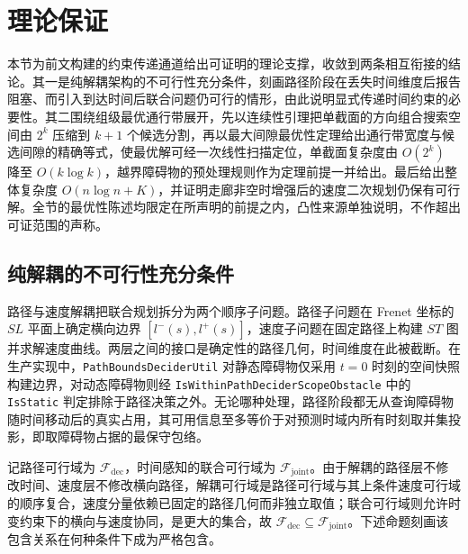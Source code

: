 \documentclass[a4paper,11pt]{ctexart}
\theoremstyle{definition}
\begin{document}
\section{理论保证}
\label{sec:theory}

本节为前文构建的约束传递通道给出可证明的理论支撑，收敛到两条相互衔接的结论。其一是纯解耦架构的不可行性充分条件，刻画路径阶段在丢失时间维度后报告阻塞、而引入到达时间后联合问题仍可行的情形，由此说明显式传递时间约束的必要性。其二围绕组级最优通行带展开，先以连续性引理把单截面的方向组合搜索空间由 $2^k$ 压缩到 $k+1$ 个候选分割，再以最大间隙最优性定理给出通行带宽度与候选间隙的精确等式，使最优解可经一次线性扫描定位，单截面复杂度由 $O(2^k)$ 降至 $O(k\log k)$，越界障碍物的预处理规则作为定理前提一并给出。最后给出整体复杂度 $O(n\log n + K)$，并证明走廊非空时增强后的速度二次规划仍保有可行解。全节的最优性陈述均限定在所声明的前提之内，凸性来源单独说明，不作超出可证范围的声称。

\subsection{纯解耦的不可行性充分条件}
\label{sec:thy_infeasible}

路径与速度解耦把联合规划拆分为两个顺序子问题。路径子问题在 Frenet 坐标的 $SL$ 平面上确定横向边界 $[l^{-}(s), l^{+}(s)]$，速度子问题在固定路径上构建 $ST$ 图并求解速度曲线。两层之间的接口是确定性的路径几何，时间维度在此被截断。在生产实现中，\texttt{PathBoundsDeciderUtil} 对静态障碍物仅采用 $t{=}0$ 时刻的空间快照构建边界，对动态障碍物则经 \texttt{IsWithinPathDeciderScopeObstacle} 中的 \texttt{IsStatic} 判定排除于路径决策之外。无论哪种处理，路径阶段都无从查询障碍物随时间移动后的真实占用，其可用信息至多等价于对预测时域内所有时刻取并集投影，即取障碍物占据的最保守包络。

记路径可行域为 $\mathcal{F}_{\text{dec}}$，时间感知的联合可行域为 $\mathcal{F}_{\text{joint}}$。由于解耦的路径层不修改时间、速度层不修改横向路径，解耦可行域是路径可行域与其上条件速度可行域的顺序复合，速度分量依赖已固定的路径几何而非独立取值；联合可行域则允许时变约束下的横向与速度协同，是更大的集合，故 $\mathcal{F}_{\text{dec}} \subseteq \mathcal{F}_{\text{joint}}$。下述命题刻画该包含关系在何种条件下成为严格包含。
\end{document}
